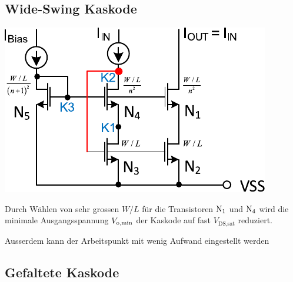 \subsection{Wide-Swing Kaskode}

\begin{minipage}[t]{0.4\columnwidth}
    \includegraphics[width=\columnwidth, align=t]{images/07_wide_swing_kaskode.pdf}
\end{minipage}
\hfill
\begin{minipage}[t]{0.56\columnwidth}
    Durch Wählen von sehr grossen $W/L$ für die Transistoren $\rm{N_1}$ und $\rm{N_4}$ wird die minimale Ausgangsspannung $V_{\rm o, min}$ der Kaskode auf fast $V_\text{DS,sat}$ reduziert.
    
    Ausserdem kann der Arbeitspunkt mit wenig Aufwand eingestellt werden
\end{minipage}



\subsection{Gefaltete Kaskode}

